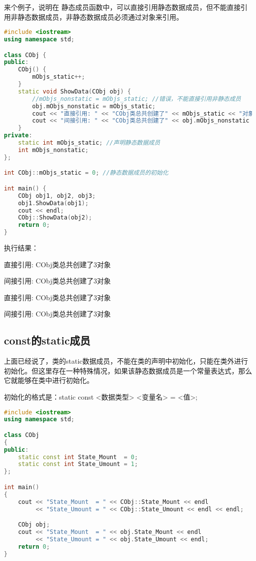 \documentclass{article}
\begin{document}
来个例子，说明在 静态成员函数中，可以直接引用静态数据成员，但不能直接引用非静态数据成员，非静态数据成员必须通过对象来引用。
\begin{lstlisting}[language=c++]
#include <iostream>
using namespace std;

class CObj {
public:
    CObj() {    
        mObjs_static++;
    }
    static void ShowData(CObj obj) {    
        //mObjs_nonstatic = mObjs_static; //错误，不能直接引用非静态成员
        obj.mObjs_nonstatic = mObjs_static;
        cout << "直接引用: " << "CObj类总共创建了" << mObjs_static << "对象" << endl;
        cout << "间接引用: " << "CObj类总共创建了" << obj.mObjs_nonstatic << "对象" << endl;
    }
private:
    static int mObjs_static; //声明静态数据成员
    int mObjs_nonstatic;
};

int CObj::mObjs_static = 0; //静态数据成员的初始化

int main() {
    CObj obj1, obj2, obj3;
    obj1.ShowData(obj1);
    cout << endl;
    CObj::ShowData(obj2);
    return 0;
}
\end{lstlisting}

执行结果：

直接引用: CObj类总共创建了3对象

间接引用: CObj类总共创建了3对象

直接引用: CObj类总共创建了3对象

间接引用: CObj类总共创建了3对象
\subsection{const的static成员}
\label{sec-6-3}

上面已经说了，类的static数据成员，不能在类的声明中初始化，只能在类外进行初始化。但这里存在一种特殊情况，如果该静态数据成员是一个常量表达式，那么它就能够在类中进行初始化。

初始化的格式是：static const <数据类型> <变量名> = <值>;

\begin{lstlisting}[language=c++]
#include <iostream>
using namespace std;

class CObj
{
public:
    static const int State_Mount  = 0;
    static const int State_Umount = 1;
};

int main()
{
    cout << "State_Mount  = " << CObj::State_Mount << endl
         << "State_Umount = " << CObj::State_Umount << endl << endl;

    CObj obj;
    cout << "State_Mount  = " << obj.State_Mount << endl
         << "State_Umount = " << obj.State_Umount << endl;
    return 0;
}
\end{lstlisting}
\end{document}
